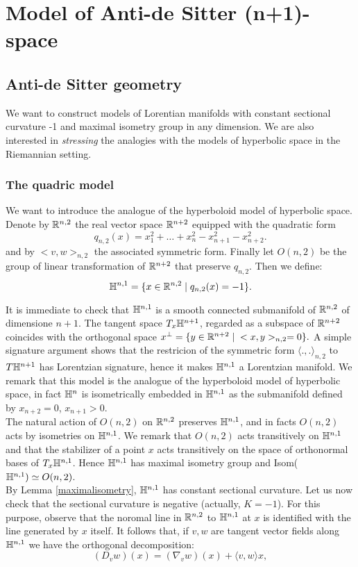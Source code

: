 \chapter{Model of Anti-de Sitter (n+1)-space}
\section{Anti-de Sitter geometry}
We want to construct models of Lorentian manifolds with constant sectional curvature -1 and maximal isometry group in any dimension. We are also interested in \textit{stressing} the analogies with the models of hyperbolic space in the Riemannian setting. 

\subsection{The quadric model}
We want to introduce the analogue of the hyperboloid model of hyperbolic space. Denote by $\mathbb{R}^{n,2}$ the real vector space $\mathbb{R}^{n+2}$ equipped with the quadratic form 
\[
    q_{n,2}(x)=x_1^{2}+\dots+x_n^{2}-x_{n+1}^{2}-x_{n+2}^2.   
\]
and by $<v,w>_{n,2}$ the associated symmetric form. Finally let $O(n,2)$ be the group of linear transformation of $\mathbb{R}^{n+2}$ that preserve $q_{n,2}.$
Then we define: 
\[
    \mathbb{H}^{n,1}=\{x\in \mathbb{R}^{n,2}\;|\;q_{n,2}(x)=-1\}.
\]

It is immediate to check that $\mathbb{H}^{n,1}$ is a smooth connected submanifold of $\mathbb{R}^{n,2}$ of dimensione $n+1$. The tangent space $T_x\mathbb{H}^{n+1}$, regarded as a subspace of $\mathbb{R}^{n+2}$ coincides with the orthogonal space $x^{\perp}=\{y\in \mathbb{R}^{n+2}\;|\;<x,y>_{n,2}=0\}.$ A simple signature argument  shows that the restricion of the symmetric form $\langle .,. \rangle_{n,2}$ to $T\mathbb{H}^{n+1}$ has Lorentzian signature, hence it makes $\mathbb{H}^{n,1}$ a Lorentzian manifold. We remark that this model is the analogue of the hyperboloid model of hyperbolic space, in fact $\mathbb{H}^n$ is isometrically embedded in $\mathbb{H}^{n,1}$ as the submanifold defined by $x_{n+2}=0$, $x_{n+1}>0$. \\
The natural action of $O(n,2)$ on $\mathbb{R}^{n,2}$ preserves $\mathbb{H}^{n,1}$, and in facts $O(n,2)$ acts by isometries on $\mathbb{H}^{n,1}$. We remark that $O(n,2)$ acts transitively on $\mathbb{H}^{n,1}$ and that the stabilizer of a point $x$ acts transitively on the space of orthonormal bases of $T_x\mathbb{H}^{n,1}$. Hence $\mathbb{H}^{n,1}$ has maximal isometry group and Isom($\mathbb{H}^{n,1})\simeq O(n,2)$.\\
By Lemma \ref{maximalisometry}, $\mathbb{H}^{n,1}$ has constant sectional curvature. Let us now check that the sectional curvature is negative (actually, $K=-1$). For this purpose, observe that the noromal line in $\mathbb{R}^{n,2}$ to $\mathbb{H}^{n,1}$ at $x$ is identified with the line generated by $x$ itself. It follows that, if $v,w$ are tangent vector fields along $\mathbb{H}^{n,1}$ we have the orthogonal decomposition: 
\[
    (D_{v}w)(x)=(\nabla_{v}w)(x)+\langle v,w\rangle x, 
\]

